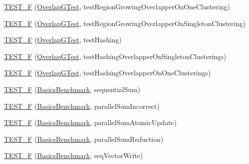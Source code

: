 \begin{DoxyCompactItemize}
\item 
\hyperlink{namespace_ensemble_clustering_a43428ffe183091d6cc28baa63f017bf7}{T\-E\-S\-T\-\_\-\-F} (\hyperlink{class_ensemble_clustering_1_1_overlap_g_test}{Overlap\-G\-Test}, test\-Region\-Growing\-Overlapper\-On\-One\-Clustering)
\item 
\hyperlink{namespace_ensemble_clustering_a4d0cdfc33460f51f6195760d8e8775dc}{T\-E\-S\-T\-\_\-\-F} (\hyperlink{class_ensemble_clustering_1_1_overlap_g_test}{Overlap\-G\-Test}, test\-Region\-Growing\-Overlapper\-On\-Singleton\-Clustering)
\item 
\hyperlink{namespace_ensemble_clustering_afd8c7e01ff77404e776f4587f526cfb1}{T\-E\-S\-T\-\_\-\-F} (\hyperlink{class_ensemble_clustering_1_1_overlap_g_test}{Overlap\-G\-Test}, test\-Hashing)
\item 
\hyperlink{namespace_ensemble_clustering_ac74bda0e074b04dee65ea7253298d801}{T\-E\-S\-T\-\_\-\-F} (\hyperlink{class_ensemble_clustering_1_1_overlap_g_test}{Overlap\-G\-Test}, test\-Hashing\-Overlapper\-On\-Singleton\-Clusterings)
\item 
\hyperlink{namespace_ensemble_clustering_a6eafc9254c8f7b65503d9e8f5cbcc8fc}{T\-E\-S\-T\-\_\-\-F} (\hyperlink{class_ensemble_clustering_1_1_overlap_g_test}{Overlap\-G\-Test}, test\-Hashing\-Overlapper\-On\-One\-Clusterings)
\item 
\hyperlink{namespace_ensemble_clustering_af79b629a48656929da922a8e4c9c0fa6}{T\-E\-S\-T\-\_\-\-F} (\hyperlink{class_ensemble_clustering_1_1_basics_benchmark}{Basics\-Benchmark}, sequential\-Sum)
\item 
\hyperlink{namespace_ensemble_clustering_aa5f1eea0d18ca4cc952be1f22f0878e5}{T\-E\-S\-T\-\_\-\-F} (\hyperlink{class_ensemble_clustering_1_1_basics_benchmark}{Basics\-Benchmark}, parallel\-Sum\-Incorrect)
\item 
\hyperlink{namespace_ensemble_clustering_ad90f341fb32b749f17ef25c6df1fc33e}{T\-E\-S\-T\-\_\-\-F} (\hyperlink{class_ensemble_clustering_1_1_basics_benchmark}{Basics\-Benchmark}, parallel\-Sum\-Atomic\-Update)
\item 
\hyperlink{namespace_ensemble_clustering_a513105e2c2f5e9cf3cf3a4eb0ca3aa06}{T\-E\-S\-T\-\_\-\-F} (\hyperlink{class_ensemble_clustering_1_1_basics_benchmark}{Basics\-Benchmark}, parallel\-Sum\-Reduction)
\item 
\hyperlink{namespace_ensemble_clustering_a6ae2435f077df236e477cd54f95a0332}{T\-E\-S\-T\-\_\-\-F} (\hyperlink{class_ensemble_clustering_1_1_basics_benchmark}{Basics\-Benchmark}, seq\-Vector\-Write)
\item 

\end{DoxyCompactItemize}
